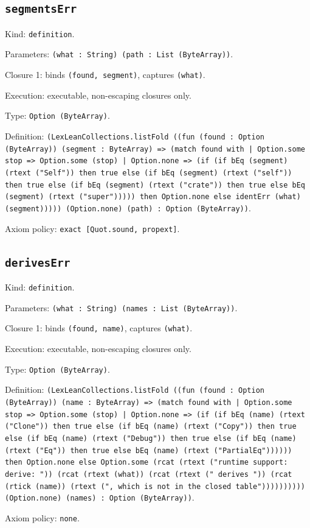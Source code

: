 \documentclass[11pt]{article}
\begin{document}
\subsection*{\texttt{segmentsErr}}
\noindent Kind: \texttt{definition}.\par
\noindent Parameters: \texttt{(what : String) (path : List (ByteArray))}.\par
\noindent Closure 1: binds \texttt{(found, segment)}, captures \texttt{(what)}.\par
\noindent Execution: executable, non-escaping closures only.\par
\noindent Type: \texttt{Option (ByteArray)}.\par
\noindent Definition: \texttt{(LexLeanCollections.listFold ((fun (found : Option (ByteArray)) (segment : ByteArray) => (match found with | Option.some stop => Option.some (stop) | Option.none => (if (if bEq (segment) (rtext ("Self")) then true else (if bEq (segment) (rtext ("self")) then true else (if bEq (segment) (rtext ("crate")) then true else bEq (segment) (rtext ("super"))))) then Option.none else identErr (what) (segment))))) (Option.none) (path) : Option (ByteArray))}.\par
\noindent Axiom policy: \texttt{exact [Quot.sound, propext]}.\par
\subsection*{\texttt{derivesErr}}
\noindent Kind: \texttt{definition}.\par
\noindent Parameters: \texttt{(what : String) (names : List (ByteArray))}.\par
\noindent Closure 1: binds \texttt{(found, name)}, captures \texttt{(what)}.\par
\noindent Execution: executable, non-escaping closures only.\par
\noindent Type: \texttt{Option (ByteArray)}.\par
\noindent Definition: \texttt{(LexLeanCollections.listFold ((fun (found : Option (ByteArray)) (name : ByteArray) => (match found with | Option.some stop => Option.some (stop) | Option.none => (if (if bEq (name) (rtext ("Clone")) then true else (if bEq (name) (rtext ("Copy")) then true else (if bEq (name) (rtext ("Debug")) then true else (if bEq (name) (rtext ("Eq")) then true else bEq (name) (rtext ("PartialEq")))))) then Option.none else Option.some (rcat (rtext ("runtime support: derive: ")) (rcat (rtext (what)) (rcat (rtext (" derives ")) (rcat (rtick (name)) (rtext (", which is not in the closed table")))))))))) (Option.none) (names) : Option (ByteArray))}.\par
\noindent Axiom policy: \texttt{none}.\par
\end{document}

